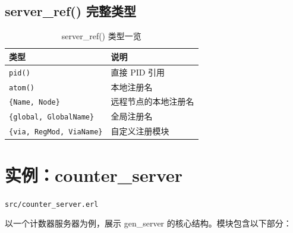 \documentclass[a4paper,11pt]{article}
\begin{document}
\subsection{server\_ref() 完整类型}

\begin{table}[H]
\centering
\begin{tabular}{@{}ll@{}}
\toprule
\textbf{类型} & \textbf{说明} \\
\midrule
\texttt{pid()} & 直接 PID 引用 \\
\texttt{atom()} & 本地注册名 \\
\texttt{\{Name, Node\}} & 远程节点的本地注册名 \\
\texttt{\{global, GlobalName\}} & 全局注册名 \\
\texttt{\{via, RegMod, ViaName\}} & 自定义注册模块 \\
\bottomrule
\end{tabular}
\caption{server\_ref() 类型一览}
\end{table}




\section{实例：counter\_server}

\begin{notebox}[源码文件]
\texttt{src/counter\_server.erl}
\end{notebox}

以一个计数器服务器为例，展示 gen\_server 的核心结构。模块包含以下部分：
\end{document}
